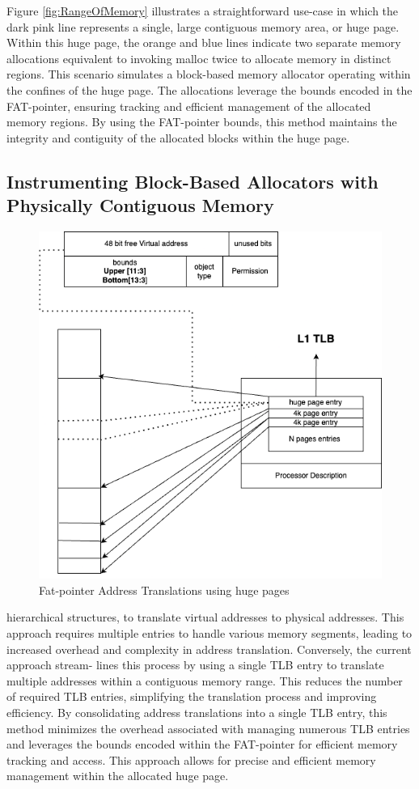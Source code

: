 \documentclass[11pt]{article}
\begin{document}
Figure \ref{fig:RangeOfMemory} illustrates a straightforward use-case in which the dark pink line represents a single, 
large contiguous memory area, or huge page. Within this huge page, the orange and blue lines indicate 
two separate memory allocations equivalent to invoking malloc twice to allocate memory in distinct regions. 
This scenario simulates a block-based memory allocator operating within the confines of the huge page. 
The allocations leverage the bounds encoded in the FAT-pointer, ensuring tracking and efficient 
management of the allocated memory regions. By using the FAT-pointer bounds, this method maintains the 
integrity and contiguity of the allocated blocks within the huge page.

\subsection{Instrumenting Block-Based Allocators with Physically Contiguous Memory}
\label{sec:org56b5427}
\begin{figure}[htbp]
\centering
\includegraphics[width=.9\linewidth]{diagram/hugepages.drawio.png}
\caption{\label{fig:org538adae}Fat-pointer Address Translations using huge pages}
\end{figure}

hierarchical structures, to translate virtual addresses to physical addresses. This approach requires multiple entries to handle various
memory segments, leading to increased overhead and complexity
in address translation. Conversely, the current approach stream-
lines this process by using a single TLB entry to translate multiple
addresses within a contiguous memory range. This reduces the
number of required TLB entries, simplifying the translation process
and improving efficiency. By consolidating address translations into
a single TLB entry, this method minimizes the overhead associated
with managing numerous TLB entries and leverages the bounds
encoded within the FAT-pointer for efficient memory tracking and
access. This approach allows for precise and efficient memory management within the allocated huge page.
\end{document}
